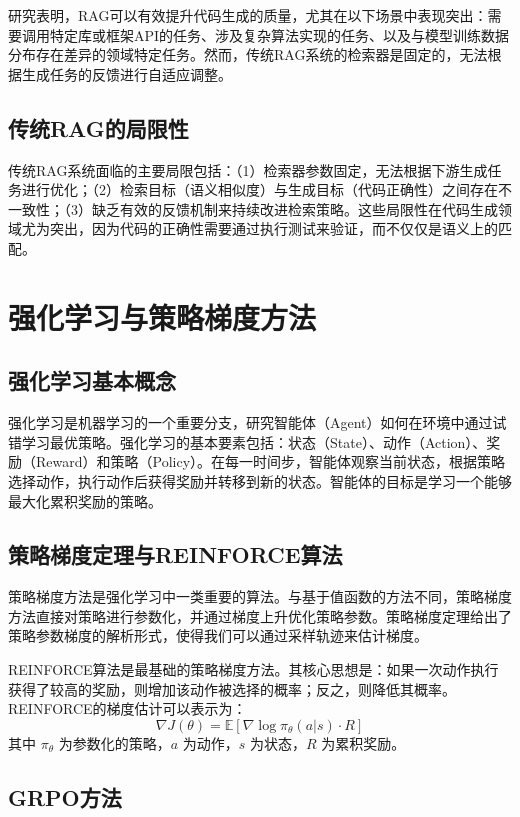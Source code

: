 \documentclass[
    fontset = win, %
  ]{njuthesis}
\begin{document}
研究表明，RAG可以有效提升代码生成的质量，尤其在以下场景中表现突出：需要调用特定库或框架API的任务、涉及复杂算法实现的任务、以及与模型训练数据分布存在差异的领域特定任务。然而，传统RAG系统的检索器是固定的，无法根据生成任务的反馈进行自适应调整。

\subsection{传统RAG的局限性}

传统RAG系统面临的主要局限包括：（1）检索器参数固定，无法根据下游生成任务进行优化；（2）检索目标（语义相似度）与生成目标（代码正确性）之间存在不一致性；（3）缺乏有效的反馈机制来持续改进检索策略。这些局限性在代码生成领域尤为突出，因为代码的正确性需要通过执行测试来验证，而不仅仅是语义上的匹配。

\section{强化学习与策略梯度方法}

\subsection{强化学习基本概念}

强化学习是机器学习的一个重要分支，研究智能体（Agent）如何在环境中通过试错学习最优策略。强化学习的基本要素包括：状态（State）、动作（Action）、奖励（Reward）和策略（Policy）。在每一时间步，智能体观察当前状态，根据策略选择动作，执行动作后获得奖励并转移到新的状态。智能体的目标是学习一个能够最大化累积奖励的策略。

\subsection{策略梯度定理与REINFORCE算法}

策略梯度方法是强化学习中一类重要的算法。与基于值函数的方法不同，策略梯度方法直接对策略进行参数化，并通过梯度上升优化策略参数。策略梯度定理给出了策略参数梯度的解析形式，使得我们可以通过采样轨迹来估计梯度。

REINFORCE\cite{reinforce1992}算法是最基础的策略梯度方法。其核心思想是：如果一次动作执行获得了较高的奖励，则增加该动作被选择的概率；反之，则降低其概率。REINFORCE的梯度估计可以表示为：
\[
\nabla J(\theta) = \mathbb{E}[\nabla \log \pi_\theta(a|s) \cdot R]
\]
其中 $\pi_\theta$ 为参数化的策略，$a$ 为动作，$s$ 为状态，$R$ 为累积奖励。

\subsection{GRPO方法}
\end{document}
